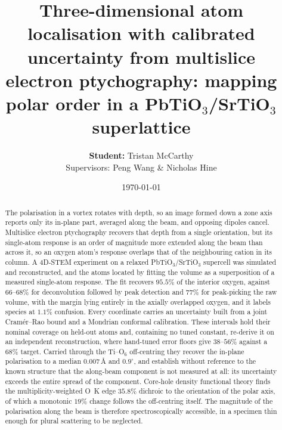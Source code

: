 \documentclass[aps,prb,twocolumn,superscriptaddress,floatfix,nofootinbib]{revtex4-2}
\begin{document}
\title{Three-dimensional atom localisation with calibrated uncertainty from multislice electron ptychography: mapping polar order in a \texorpdfstring{PbTiO$_3$/SrTiO$_3$}{PbTiO3/SrTiO3} superlattice}

\author{\textbf{Student:} Tristan McCarthy \\ Supervisors: Peng Wang \& Nicholas Hine} 


\date{\today}

\begin{abstract}
The polarisation in a vortex rotates with depth, so an image formed down a zone axis reports only its in-plane part, averaged along the beam, and opposing dipoles cancel. Multislice electron ptychography recovers that depth from a single orientation, but its single-atom response is an order of magnitude more extended along the beam than across it, so an oxygen atom's response overlaps that of the neighbouring cation in its column. A 4D-STEM experiment on a relaxed PbTiO$_3$/SrTiO$_3$ supercell was simulated and reconstructed, and the atoms located by fitting the volume as a superposition of a measured single-atom response. The fit recovers $95.5\%$ of the interior oxygen, against $66$--$68\%$ for deconvolution followed by peak detection and $77\%$ for peak-picking the raw volume, with the margin lying entirely in the axially overlapped oxygen, and it labels species at $1.1\%$ confusion. Every coordinate carries an uncertainty built from a joint Cram\'er--Rao bound and a Mondrian conformal calibration. These intervals hold their nominal coverage on held-out atoms and, containing no tuned constant, re-derive it on an independent reconstruction, where hand-tuned error floors give $38$--$56\%$ against a $68\%$ target. Carried through the Ti--O$_6$ off-centring they recover the in-plane polarisation to a median $0.007$\,\AA{} and $0.9^\circ$, and establish without reference to the known structure that the along-beam component is not measured at all: its uncertainty exceeds the entire spread of the component. Core-hole density functional theory finds the multiplicity-weighted O~K edge $35.8\%$ dichroic to the orientation of the polar axis, of which a monotonic $19\%$ change follows the off-centring itself. The magnitude of the polarisation along the beam is therefore spectroscopically accessible, in a specimen thin enough for plural scattering to be neglected.
\end{abstract}

\maketitle
\end{document}
